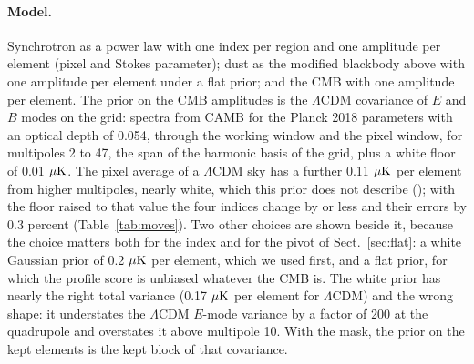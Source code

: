 \paragraph{Model.} Synchrotron as a power law with one index per region and one amplitude per
element (pixel and Stokes parameter); dust as the modified blackbody above with one amplitude per
element under a flat prior; and the CMB with one amplitude per element. The prior on the CMB
amplitudes is the $\Lambda$CDM covariance of $E$ and $B$ modes on the grid: spectra from CAMB
\citep{lewis2000} for the Planck 2018 parameters \citep{planck2018vi} with an optical depth of 0.054,
through the working window and the pixel window, for multipoles 2 to 47, the span of the harmonic
basis of the grid, plus a white floor of 0.01 $\mu\mathrm{K}$. The pixel average of a $\Lambda$CDM sky has a
further 0.11 $\mu\mathrm{K}$ per element from higher multipoles, nearly white, which this prior does not
describe (); with the floor raised to that value the four indices
change by  or less and their errors by 0.3 percent (Table~\ref{tab:moves}). Two other choices
are shown beside it, because the choice matters both for the index and for the pivot of
Sect.~\ref{sec:flat}: a white Gaussian prior of 0.2 $\mu\mathrm{K}$ per element, which we used first, and a
flat prior, for which the profile score is unbiased whatever the CMB is. The white prior has nearly
the right total variance (0.17 $\mu\mathrm{K}$ per element for $\Lambda$CDM) and the wrong shape: it
understates the $\Lambda$CDM $E$-mode variance by a factor of 200 at the quadrupole and overstates it
above multipole 10. With the mask, the prior on the kept elements is the kept block of that
covariance.


